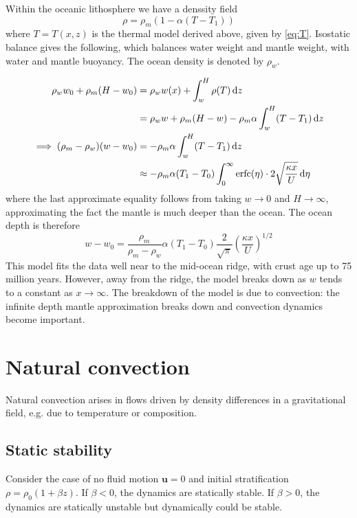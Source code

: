 \documentclass{jknotes}
\begin{document}
Within the oceanic lithosphere we have a denssity field
\begin{equation}
	\rho = \rho_m \left( 1- \alpha (T - T_1)\right)
\end{equation}
where $T=T(x,z)$ is the thermal model derived above, given by \eqref{eq:T}.
Isostatic balance gives the following, which balances water weight and mantle
weight, with water and mantle buoyancy. The ocean density is denoted by
$\rho_w$.

\begin{align}
	\rho_w w_0 + \rho_m (H - w_0) &= \rho_w w(x) + \int_w^H \rho(T) \, \diffd
	z \\
	  &= \rho_w w + \rho_m (H-w) - \rho_m \alpha \int_w^H (T-T_1) \, \diffd z \\
	\implies (\rho_m - \rho_w)(w-w_0) &= - \rho_m \alpha \int_w^H (T-T_1) \,
	\diffd z \\
	&\approx  - \rho_m \alpha (T_1 - T_0) \int_0^\infty \text{erfc}(\eta)
	\cdot 2 \sqrt{\frac{\kappa x}{U}} \, \diffd \eta
\end{align}
where the last approximate equality follows from taking $w \to 0$ and $H \to
\infty$, approximating the fact the mantle is much deeper than the ocean. The
ocean depth is therefore
\begin{equation}
	w-w_0 = \frac{\rho_m}{\rho_m - \rho_w} \alpha (T_1-T_0)
	\frac{2}{\sqrt{\pi}} \left(\frac{\kappa x}{U}\right)^{1/2}
\end{equation}
This model fits the data well near to the mid-ocean ridge, with crust age up
to 75 million years. However, away from the ridge, the model breaks down as
$w$ tends to a constant as $x \to \infty$. The breakdown of the model is due
to convection: the infinite depth mantle approximation breaks down and
convection dynamics become important.

\section{Natural convection}
Natural convection arises in flows driven by density differences in a
gravitational field, e.g. due to temperature or composition.

\subsection{Static stability}
Consider the case of no fluid motion $\symbf{u} = 0$ and initial
stratification $\rho = \rho_0 (1+\beta z)$.  If $\beta < 0$, the dynamics are
statically stable. If $\beta > 0$, the dynamics are statically unstable but
dynamically could be stable. 
\end{document}
